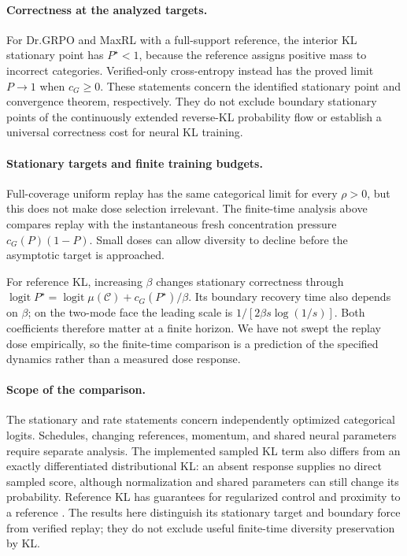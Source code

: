 \paragraph{Correctness at the analyzed targets.}
For Dr.GRPO and MaxRL with a full-support reference, the interior KL
stationary point has $P^\star<1$, because the reference assigns positive
mass to incorrect categories. Verified-only cross-entropy instead has the
proved limit $P\to1$ when $c_G\ge0$. These statements concern the identified
stationary point and convergence theorem, respectively. They do not exclude
boundary stationary points of the continuously extended reverse-KL
probability flow or establish a universal correctness cost for neural KL
training.

\paragraph{Stationary targets and finite training budgets.}
Full-coverage uniform replay has the same categorical limit for every
$\rho>0$, but this does not make dose selection irrelevant.
The finite-time analysis above compares replay with the instantaneous
fresh concentration pressure $c_G(P)(1-P)$. Small doses can allow diversity
to decline before the asymptotic target is approached.

For reference KL, increasing $\beta$ changes stationary correctness through
$\operatorname{logit}P^\star=\operatorname{logit}\mu(\mathcal C)+c_G(P^\star)/\beta$.
Its boundary recovery time also depends on $\beta$; on the two-mode face
the leading scale is $1/[2\beta s\log(1/s)]$.
Both coefficients therefore matter at a finite horizon. We have not swept
the replay dose empirically, so the finite-time comparison is a prediction of
the specified dynamics rather than a measured dose response.

\paragraph{Scope of the comparison.}
The stationary and rate statements concern independently optimized
categorical logits. Schedules, changing references, momentum, and shared
neural parameters require separate analysis. The implemented sampled KL
term also differs from an exactly differentiated distributional KL:
an absent response supplies no direct sampled score, although normalization
and shared parameters can still change its probability.
Reference KL has guarantees for regularized control and proximity to a
reference \citep{geist2019regmdp,vieillard2020kl}. The results here distinguish
its stationary target and boundary force from verified replay; they do not
exclude useful finite-time diversity preservation by KL.

